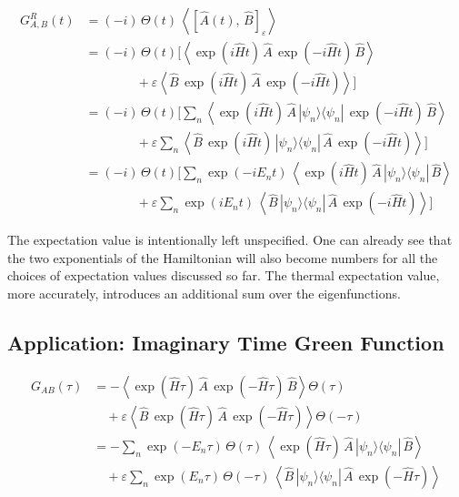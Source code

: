\begin{align*}
    G^{R}_{A,B}(t) &= (-i)\, \Theta(t)\, \left\langle \left[ \hat{A}(t),\, \hat{B} \right]_{\varepsilon} \right\rangle \\[1ex]
    &= (-i)\, \Theta(t) \Big[ \left\langle \exp(i\hat{H}t)\, \hat{A}\, \exp(-i\hat{H}t)\, \hat{B} \right\rangle \\
    &\qquad\qquad + \varepsilon \left\langle \hat{B}\, \exp(i\hat{H}t)\, \hat{A}\, \exp(-i\hat{H}t) \right\rangle \Big] \\[1ex]
    &= (-i)\, \Theta(t) \Big[ \sum_n \left\langle \exp(i\hat{H}t)\, \hat{A}\, |\psi_n\rangle\langle\psi_n|\, \exp(-i\hat{H}t)\, \hat{B} \right\rangle \\
    &\qquad\qquad + \varepsilon \sum_n \left\langle \hat{B}\, \exp(i\hat{H}t)\, |\psi_n\rangle\langle\psi_n|\, \hat{A}\, \exp(-i\hat{H}t) \right\rangle \Big] \\[1ex]
    &= (-i)\, \Theta(t) \Big[ \sum_n \exp(-i E_n t)\, \left\langle \exp(i\hat{H}t)\, \hat{A}\, |\psi_n\rangle\langle\psi_n|\, \hat{B} \right\rangle \\
    &\qquad\qquad + \varepsilon \sum_n \exp(i E_n t)\, \left\langle \hat{B}\, |\psi_n\rangle\langle\psi_n|\, \hat{A}\, \exp(-i\hat{H}t) \right\rangle \Big]
\end{align*}

The expectation value is intentionally left unspecified. One can already see that the two exponentials of the Hamiltonian will also become numbers for all the choices of expectation values discussed so far.
The thermal expectation value, more accurately, introduces an additional sum over the eigenfunctions.

\subsection*{Application: Imaginary Time Green Function}
\begin{align*}
    G_{AB}(\tau) &= -\left\langle \exp(\hat{H}\tau)\, \hat{A}\, \exp(-\hat{H}\tau)\, \hat{B} \right\rangle \Theta(\tau) \\
    &\quad + \varepsilon \left\langle \hat{B}\, \exp(\hat{H}\tau)\, \hat{A}\, \exp(-\hat{H}\tau) \right\rangle \Theta(-\tau) \\[1ex]
    &= -\sum_n \exp(-E_n \tau)\, \Theta(\tau)\, \left\langle \exp(\hat{H}\tau)\, \hat{A}\, |\psi_n\rangle\langle\psi_n|\, \hat{B} \right\rangle \\
    &\quad + \varepsilon \sum_n \exp(E_n \tau)\, \Theta(-\tau)\, \left\langle \hat{B}\, |\psi_n\rangle\langle\psi_n|\, \hat{A}\, \exp(-\hat{H}\tau) \right\rangle
\end{align*}

